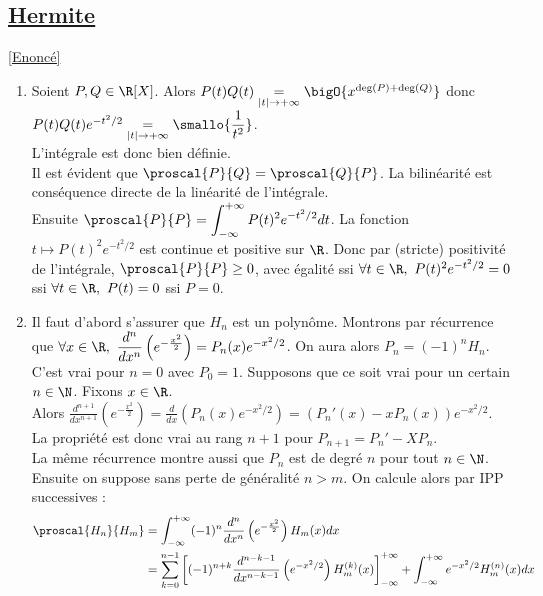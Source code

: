 \documentclass{book}
\begin{document}
	\subsection{\underline{Hermite} }
	\label{sec:Hermite}
	\textcolor{blue}{\hyperref[Hermite]{[Enoncé]}}\\
	\begin{enumerate}[leftmargin=*]
		\item Soient $P,Q\in \R[X]$. Alors $P(t)Q(t)\underset{|t|\to+\infty}=\bigO{x^{\deg(P)+\deg(Q)}}$ donc $P(t)Q(t)e^{-t^2/2}\underset{|t|\to+\infty}=\smallo{\dfrac{1}{t^2}}$.\\
		L'intégrale est donc bien définie.\\
		Il est évident que $\proscal{P}{Q}=\proscal{Q}{P}$. La bilinéarité est conséquence directe de la linéarité de l'intégrale.\\
		Ensuite $\proscal{P}{P}=\displaystyle\int_{-\infty}^{+\infty}P(t)^2e^{-t^2/2}dt$. La fonction $t\mapsto P(t)^2e^{-t^2/2}$ est continue et positive sur $\R$. Donc par (stricte) positivité de l'intégrale, $\proscal{P}{P}\geq 0$, avec égalité ssi $\forall t\in \R,\ P(t)^2e^{-t^2/2}=0$ ssi $\forall t\in \R,\ P(t)=0$ ssi $P=0$.
		\item Il faut d'abord s'assurer que $H_n$ est un polynôme. Montrons par récurrence que $\forall x\in \R,\ \dfrac{d^n}{dx^n}\left(e^{-\frac{x^2}{2}}\right)=P_n(x)e^{-x^2/2}$. On aura alors $P_n=(-1)^nH_n$.\\
		C'est vrai pour $n=0$ avec $P_0=1$. Supposons que ce soit vrai pour un certain $n\in \N$. Fixons $x\in \R$.\\
		Alors $\displaystyle\frac{d^{n+1}}{dx^{n+1}}\left(e^{-\frac{x^2}{2}}\right)=\frac{d}{dx}\left(P_n(x)e^{-x^2/2}\right)=(P_n'(x)-xP_n(x))e^{-x^2/2}$.\\
		La propriété est donc vrai au rang $n+1$ pour $P_{n+1}=P_n'-XP_n$.\\
		La même récurrence montre aussi que $P_n$ est de degré $n$ pour tout $n\in \N$.\\
		Ensuite on suppose sans perte de généralité $n>m$. On calcule alors par IPP successives :
		\begin{align*}
			\proscal{H_n}{H_m}&=\int_{-\infty}^{+\infty}(-1)^n\frac{d^n}{dx^n}\left(e^{-\frac{x^2}{2}}\right)H_m(x)dx\\
			&=\sum_{k=0}^{n-1}\left[(-1)^{n+k}\frac{d^{n-k-1}}{dx^{n-k-1}}\left(e^{-x^2/2}\right)H_m^{(k)}(x)\right]_{-\infty}^{+\infty}+\int_{-\infty}^{+\infty}e^{-x^2/2}H_m^{(n)}(x)dx
		\end{align*}

\end{enumerate}
\end{document}
